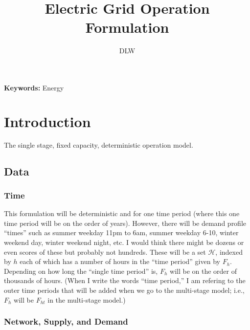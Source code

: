 \documentclass[11pt]{article}
\title{Electric Grid Operation Formulation}
\author{DLW}
\date{}
\begin{document}

\maketitle

{\bf Keywords:} Energy


\section{Introduction}

The single stage, fixed capacity, deterministic operation model.

\subsection{Data}

\subsubsection{Time}

This formulation will be deterministic and for one time period (where this one time period will be on the order of years). However, there will be demand profile ``times'' such as summer weekday 11pm to 6am, summer weekday 6-10,  winter weekend day, winter weekend night, etc. I would think there might be dozens or even scores of these but probably not hundreds. These will be a set $\mathcal{H}$, indexed by $h$ each of which has a number of hours in the ``time period'' given by $F_h$. Depending on how long the ``single time period'' is, $F_h$ will be on the order of thousands of hours. (When I write the words ``time period,'' I am refering to the outer time periods that will be added when we go to the multi-stage model; i.e., $F_h$ will be $F_{ht}$ in
the multi-stage model.)

\subsubsection{Network, Supply, and Demand}
\end{document}
